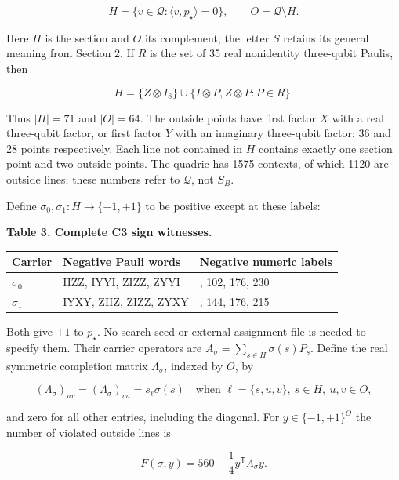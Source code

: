 \documentclass[11pt,a4paper]{article}
\begin{document}
\[H=\{v\in\mathcal Q:\langle v,p_\star\rangle=0\},\qquad
O=\mathcal Q\setminus H.\]

Here \(H\) is the section and \(O\) its complement; the letter \(S\) retains its general meaning from
Section 2. If \(R\) is the set of 35 real nonidentity three-qubit Paulis, then

\[H=\{Z\otimes I_8\}\cup\{I\otimes P,Z\otimes P:P\in R\}.\]

Thus \(|H|=71\) and \(|O|=64\). The outside points have first factor \(X\) with a real three-qubit factor,
or first factor \(Y\) with an imaginary three-qubit factor: 36 and 28 points respectively. Each line
not contained in \(H\) contains exactly one section point and two outside points. The quadric has
1575 contexts, of which 1120 are outside lines; these numbers refer to \(\mathcal Q\), not \(S_B\).

Define \(\sigma_0,\sigma_1:H\to\{-1,+1\}\) to be positive except at these labels:

\textbf{Table 3. Complete C3 sign witnesses.}

{\def\LTcaptype{none} %
{\small
\begin{longtable}[]{@{}>{\raggedright\arraybackslash}p{}>{\raggedright\arraybackslash}p{}>{\raggedright\arraybackslash}p{}@{}}
\toprule\noalign{}
Carrier & Negative Pauli words & Negative numeric labels \\
\midrule\noalign{}
\endhead
\bottomrule\noalign{}
\endlastfoot
\(\sigma_0\) & IIZZ, IYYI, ZIZZ, ZYYI & 48, 102, 176, 230 \\
\(\sigma_1\) & IYXY, ZIIZ, ZIZZ, ZYXY & 87, 144, 176, 215 \\
\end{longtable}
}
}

Both give \(+1\) to \(p_\star\). No search seed or external assignment file is needed to specify them.
Their carrier operators are \(A_\sigma=\sum_{s\in H}\sigma(s)P_s\). Define the real symmetric
completion matrix \(\Lambda_\sigma\), indexed by \(O\), by

\[(\Lambda_\sigma)_{uv}=(\Lambda_\sigma)_{vu}=s_\ell\sigma(s)
\quad\text{when }\ell=\{s,u,v\},\ s\in H,\ u,v\in O,\]

and zero for all other entries, including the diagonal. For \(y\in\{-1,+1\}^O\) the number of
violated outside lines is

\[F(\sigma,y)=560-\frac14y^{\mathsf T}\Lambda_\sigma y.
\tag{C1}\]
\end{document}
